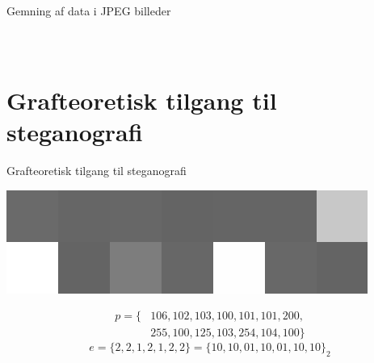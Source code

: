 \begin{frame}{Gemning af data i JPEG billeder}{}
\begin{minipage}[0.5\textheight]{\textwidth}
\begin{columns}[T]
\begin{column}{0.5\textwidth}
{\begin{table}[]
\begin{tabular}{|c|c|c|c|c|c|c|c|}
						\end{tabular}
					\end{table}
				}
			\end{column}
		\end{columns}
	\end{minipage}
	
\end{frame}

\section{Grafteoretisk tilgang til steganografi}
\begin{frame}{Grafteoretisk tilgang til steganografi}{}
	\begin{center}
		\includegraphics[width=.4\textwidth, frame]{figures/pixelgrid.png}
	\end{center}
	\begin{align*}
		p = \{&106,102,103,100,101,101,200,\\&255,100,125,103,254,104,100\}
	\end{align*}
	$$ e = \{2,2,1,2,1,2,2\} = \{10,10,01,10,01,10,10\}_2$$
	

\end{frame}

